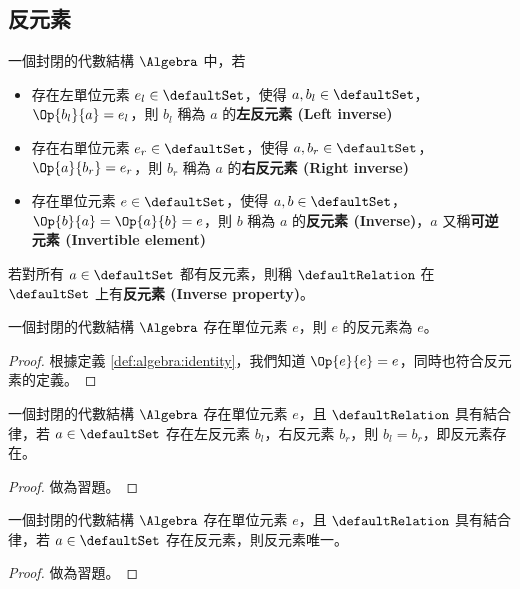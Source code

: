 \documentclass[12pt,a4paper,oneside]{report}
\begin{document}
\begin{CJK}{UTF8}{bkai}
\subsection{反元素}

\begin{mydef}[反元素]
\label{def:algebra:inverse}
一個封閉的代數結構 $\Algebra$ 中，若
\begin{itemize}
\item 存在左單位元素 $e_l\in{\defaultSet}$，使得 $a,b_l\in{\defaultSet}$，$\Op{b_l}{a}=e_l$，則 $b_l$ 稱為 $a$ 的\textbf{左反元素 (Left inverse)}
\item 存在右單位元素 $e_r\in{\defaultSet}$，使得 $a,b_r\in{\defaultSet}$，$\Op{a}{b_r}=e_r$，則 $b_r$ 稱為 $a$ 的\textbf{右反元素 (Right inverse)}
\item 存在單位元素 $e\in{\defaultSet}$，使得 $a,b\in{\defaultSet}$，$\Op{b}{a}=\Op{a}{b}=e$，則 $b$ 稱為 $a$ 的\textbf{反元素 (Inverse)}，$a$ 又稱\textbf{可逆元素 (Invertible element)}
\end{itemize}
若對所有 $a\in{\defaultSet}$ 都有反元素，則稱 $\defaultRelation$ 在 $\defaultSet$ 上有\textbf{反元素 (Inverse property)}。
\end{mydef}

\begin{mypropo}
\label{pro:algebra:identity_has_inverse}
一個封閉的代數結構 $\Algebra$ 存在單位元素 $e$，則 $e$ 的反元素為 $e$。
\end{mypropo}
\begin{proof}
根據定義 \ref{def:algebra:identity}，我們知道 $\Op{e}{e}=e$，同時也符合反元素的定義。
\end{proof}

\begin{mythm}[反元素存在性]
\label{thm:algebra:inverse_existence}
\label{exe:algebra:inverse_existence}
一個封閉的代數結構 $\Algebra$ 存在單位元素 $e$，且 $\defaultRelation$ 具有結合律，若 $a\in{\defaultSet}$ 存在左反元素 $b_l$，右反元素 $b_r$，則 $b_l=b_r$，即反元素存在。
\end{mythm}
\begin{proof}
做為習題。
\end{proof}

\begin{mythm}[反元素唯一性]
\label{thm:algebra:inverse_uniqueness}
\label{exe:algebra:inverse_uniqueness}
一個封閉的代數結構 $\Algebra$ 存在單位元素 $e$，且 $\defaultRelation$ 具有結合律，若 $a\in{\defaultSet}$ 存在反元素，則反元素唯一。
\end{mythm}
\begin{proof}
做為習題。
\end{proof}


\end{CJK}
\end{document}
